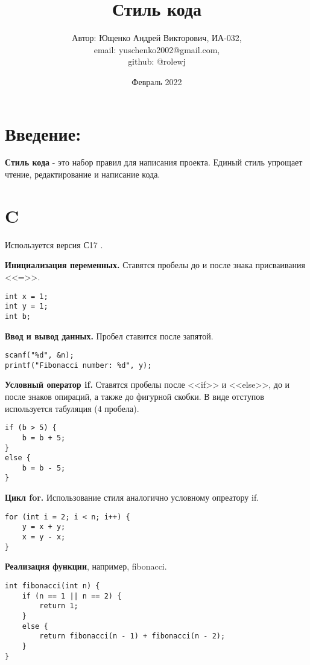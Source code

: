 \documentclass{article}
\begin{document}
\title{Стиль кода}
\author{Автор: Ющенко Андрей Викторович, ИА-032,\\ email: yuschenko2002@gmail.com,\\ github: @rolewj}
\date{Февраль 2022}

\maketitle

\section{Введение:}
\textbf{Стиль кода} - это набор правил для написания проекта. Единый стиль упрощает чтение, редактирование и написание кода.

\section{C}
Используется версия С17 \cite{C}.\vspace{5mm}

\textbf{Инициализация переменных.} Ставятся пробелы до и после знака присваивания <<=>>.
\begin{lstlisting}[caption=Инициализация переменных.]
int x = 1;
int y = 1;
int b;
\end{lstlisting}

\textbf{Ввод и вывод данных.} Пробел ставится после запятой.
\begin{lstlisting}[caption=Ввод и вывод данных.]
scanf("%d", &n);
printf("Fibonacci number: %d", y);
\end{lstlisting}

\textbf{Условный оператор if.} Ставятся пробелы после <<if>> и <<else>>, до и после знаков опираций, а также до фигурной скобки. В виде отступов используется табуляция (4 пробела).
\begin{lstlisting}[caption=Условный оператор if.]
if (b > 5) {
    b = b + 5;
}
else {
    b = b - 5;
}
\end{lstlisting}

\textbf{Цикл for.} Использование стиля аналогично условному опреатору if.
\begin{lstlisting}[caption=Цикл for.]
for (int i = 2; i < n; i++) {
    y = x + y;
    x = y - x;
}
\end{lstlisting}

\textbf{Реализация функции}, например, fibonacci.
\begin{lstlisting}[caption=Реализация функции.]
int fibonacci(int n) {
    if (n == 1 || n == 2) {
        return 1;
    } 
    else {
        return fibonacci(n - 1) + fibonacci(n - 2);
    }
}
\end{lstlisting}
\end{document}
